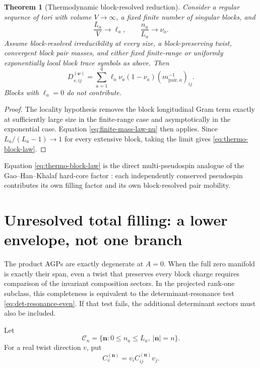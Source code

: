 \documentclass[11pt]{article}
\numberwithin{equation}{section}
\newtheorem{theorem}{Theorem}[section]
\newcommand{\cC}{\mathcal C}
\newcommand{\bn}{\mathbf n}
\begin{document}
\begin{theorem}[Thermodynamic block-resolved reduction]
\label{thm:thermo-block}
Consider a regular sequence of tori with volume $V\to\infty$, a fixed finite number of singular blocks, and
\begin{equation}
 \frac{L_a}{V}\longrightarrow\ell_a,
 \qquad
 \frac{n_a}{L_a}\longrightarrow\nu_a.
 \label{eq:block-density-limits}
\end{equation}
Assume block-resolved irreducibility at every size, a block-preserving twist, convergent block pair masses, and either fixed finite-range or uniformly exponentially local block trace symbols as above.  Then
\begin{equation}
 \boxed{
 D_{s,ij}^{(\boldsymbol\nu)}
 =\sum_{a=1}^q
 \ell_a\nu_a(1-\nu_a)
 (m_{\mathrm{pair},a}^{-1})_{ij}.}
 \label{eq:thermo-block-law}
\end{equation}
Blocks with $\ell_a=0$ do not contribute.
\end{theorem}

\begin{proof}
The locality hypothesis removes the block longitudinal Gram term exactly at sufficiently large size in the finite-range case and asymptotically in the exponential case.  Equation \eqref{eq:finite-mass-law-nu} then applies.  Since $L_a/(L_a-1)\to1$ for every extensive block, taking the limit gives \eqref{eq:thermo-block-law}.
\end{proof}

Equation \eqref{eq:thermo-block-law} is the direct multi-pseudospin analogue of the Gao--Han--Khalaf hard-core factor \cite{GaoHanKhalaf2026}: each independently conserved pseudospin contributes its own filling factor and its own block-resolved pair mobility.

\section{Unresolved total filling: a lower envelope, not one branch}

The product AGPs are exactly degenerate at $A=0$.  When the full zero manifold is exactly their span, even a twist that preserves every block charge requires comparison of the invariant composition sectors.  In the projected rank-one subclass, this completeness is equivalent to the determinant-resonance test \eqref{eq:det-resonance-even}.  If that test fails, the additional determinant sectors must also be included.

Let
\begin{equation}
 \cC_n=\{\bn:0\le n_a\le L_a,\ |\bn|=n\}.
 \label{eq:composition-set}
\end{equation}
For a real twist direction $v$, put
\begin{equation}
 C_v^{(\bn)}=v_iC_{ij}^{(\bn)}v_j.
 \label{eq:Cv}
\end{equation}
\end{document}
